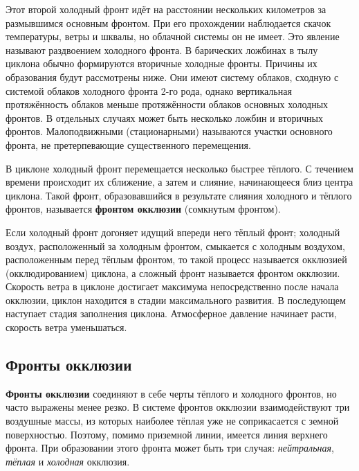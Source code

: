 \documentclass[a4paper, 12pt, twoside, final, book, russian, fittopage, cyremdash, openright]{ncc}
\begin{document}
Этот второй холодный фронт идёт на расстоянии нескольких километров за
размывшимся основным фронтом. При его прохождении наблюдается скачок
температуры, ветры и шквалы, но облачной системы он не имеет. Это
явление называют раздвоением холодного фронта.  В барических ложбинах
в тылу циклона обычно формируются вторичные холодные фронты. Причины
их образования будут рассмотрены ниже. Они имеют систему облаков,
сходную с системой облаков холодного фронта 2-го рода, однако
вертикальная протяжённость облаков меньше протяжённости облаков
основных холодных фронтов. В отдельных случаях может быть несколько
ложбин и вторичных фронтов.  Малоподвижными (стационарными) называются
участки основного фронта, не претерпевающие существенного
перемещения.

В циклоне холодный фронт перемещается несколько быстрее тёплого. С
течением времени происходит их сближение, а затем и слияние,
начинающееся близ центра циклона. Такой фронт, образовавшийся в
результате слияния холодного и тёплого фронтов, называется
\textbf{фронтом окклюзии} (сомкнутым
фронтом).

Если холодный фронт догоняет идущий впереди него тёплый фронт;
холодный воздух, расположенный за холодным фронтом, смыкается с
холодным воздухом, расположенным перед тёплым фронтом, то такой
процесс называется окклюзией (окклюдированием) циклона, а сложный
фронт называется фронтом окклюзии. Скорость ветра в циклоне достигает
максимума непосредственно после начала окклюзии, циклон находится в
стадии максимального развития. В последующем наступает стадия
заполнения циклона. Атмосферное давление начинает расти, скорость
ветра уменьшаться.

\subsection{Фронты окклюзии}
\label{sec:ocl_front}

\textbf{Фронты окклюзии} соединяют в себе черты
тёплого и холодного фронтов, но часто выражены менее резко.  В системе
фронтов окклюзии взаимодействуют три воздушные массы, из которых
наиболее тёплая уже не соприкасается с земной поверхностью. Поэтому,
помимо приземной линии, имеется линия верхнего фронта. При
образовании этого фронта может быть три случая:
\textit{нейтральная},
\textit{тёплая} и
\textit{холодная} окклюзия.
\end{document}
